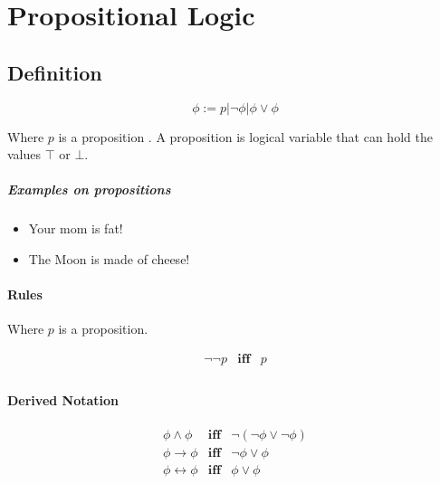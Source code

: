 \section{Propositional  Logic}

\subsection{Definition}

\begin{equation}
  \label{eq:1}
  \phi := p \vert \lnot \phi \vert \phi \lor \phi
\end{equation}

Where $p$ is a proposition . A proposition is logical variable that can hold the values $\top$ or $\bot$.

\subparagraph{Examples on propositions}

\begin{itemize}
\item Your mom is fat!
\item The Moon is made of cheese!
\end{itemize}

\paragraph{Rules}

Where $p$ is a proposition.

\begin{equation}
  \begin{matrix}
    \lnot \lnot p & \mathbf{iff} &p \\
  \end{matrix}
\end{equation}

\paragraph{Derived Notation}

\begin{equation}
  \label{equ:notation-prop}
  \begin{matrix}
   \phi \land \phi & \mathbf{iff} & \lnot ( \lnot \phi \lor \lnot \phi ) \\
   \phi \to \phi & \mathbf{iff} & \lnot \phi \lor \phi \\ 
   \phi  \leftrightarrow \phi & \mathbf{iff}& \phi \lor \phi \\ 
  \end{matrix}
\end{equation}


